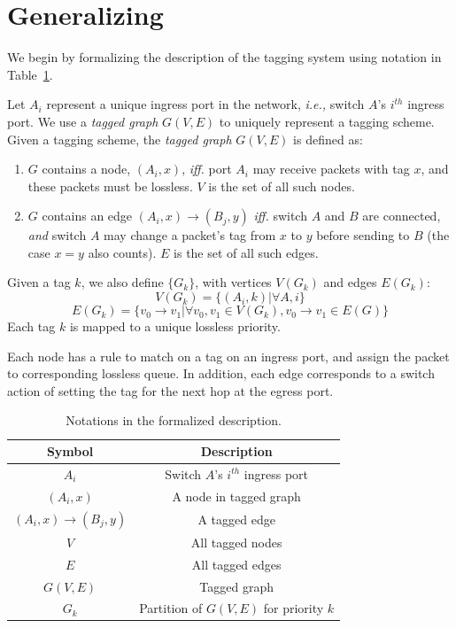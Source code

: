 \section{Generalizing \sysname{}}
\label{sec:generic}

We begin by  formalizing the description of the tagging system using notation in
Table~\ref{tab:symbols}.

Let $A_i$ represent a unique ingress port in the network, {\em i.e.,} switch
$A$'s $i^{th}$ ingress port.  We use a {\em tagged graph} $G(V,E)$ to uniquely
represent a tagging scheme.  Given a tagging scheme, the {\em tagged graph}
$G(V,E)$ is defined as:

\begin{enumerate}
\item $G$ contains a node, $(A_i, x)$, {\em iff.} port $A_i$ may receive packets with tag $x$, and these packets must
be lossless. $V$ is the set of all such nodes.

\item $G$ contains an edge $(A_i, x)\rightarrow(B_j, y)$ {\em iff.} switch $A$ and $B$ are
connected, {\em and} switch $A$ may change a packet's tag from $x$ to $y$ before sending to $B$ (the case $x=y$ also counts).
$E$ is the set of all such edges.

\end{enumerate}

Given a tag $k$, we also define $\{G_k\}$, with vertices $V(G_k)$ and edges
$E(G_k)$:
$$V(G_k) = \{(A_i, k) | \forall A, i\} $$
$$E(G_k) = \{v_0 \rightarrow v_1 | \forall v_0, v_1 \in V(G_k),  v_0 \rightarrow v_1 \in E(G)\} $$
Each tag $k$ is mapped to a unique lossless priority.

Each node has a rule to match on a tag on an ingress port, and assign the packet
to corresponding lossless queue.  In addition, each edge corresponds to a switch
action of setting the tag for the next hop at the egress port.

\begin{table}[t]
\small
\centering
\begin{tabular}{|c|c|}
\hline
Symbol & Description \\ \hline
$A_i$ & Switch $A$'s $i^{th}$ ingress port  \\ \hline
$(A_i, x)$ & A node in tagged graph \\ \hline
$(A_i, x)\rightarrow(B_j, y)$ & A tagged edge \\ \hline
$V$ & All tagged nodes  \\ \hline
$E$ & All tagged edges \\ \hline
$G(V, E)$ & Tagged graph \\ \hline
$G_k$ & Partition of $G(V,E)$ for priority $k$ \\ \hline
\end{tabular}
\caption{Notations in the formalized description.}
\label{tab:symbols}
		\vspace{-1em}
\end{table}

